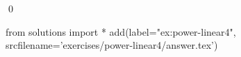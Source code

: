
\begin{ex} 
  \label{ex:power-linear4}
  
  \qed
\end{ex} 
\begin{python0}
from solutions import *
add(label="ex:power-linear4",
    srcfilename='exercises/power-linear4/answer.tex') 
\end{python0}
